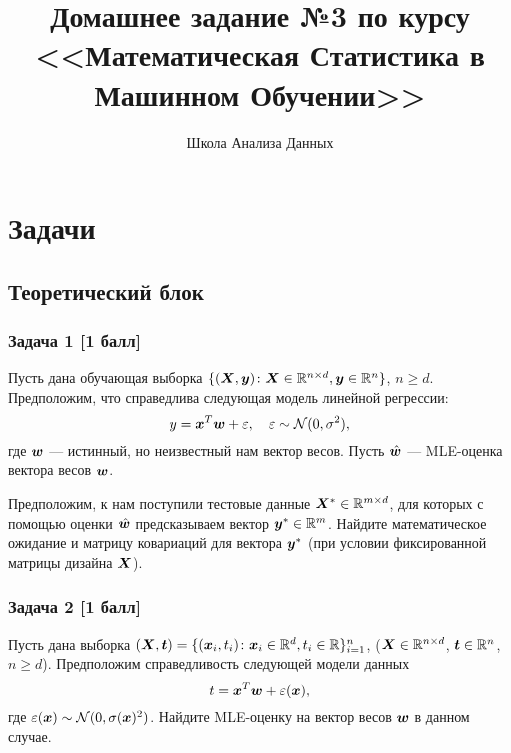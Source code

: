 \documentclass{article}
\title{Домашнее задание №3 по курсу \\ <<Математическая Статистика в Машинном Обучении>>}
\author{Школа Анализа Данных}
\date{}
\theoremstyle{plain}
\begin{document}

\maketitle

\section*{Задачи}
\subsection*{Теоретический блок}
\subsubsection*{Задача 1 [1 балл]}
Пусть дана обучающая выборка $\{(\boldsymbol{X}, \boldsymbol{y}) \colon \boldsymbol{X} \in \mathbb{R}^{n \times d}, \boldsymbol{y} \in \mathbb{R}^{n} \}$, $n \ge d$. Предположим, что справедлива следующая модель линейной регрессии:
$$
y = \boldsymbol{x}^T\boldsymbol{w} + \varepsilon, \quad \varepsilon \sim \mathcal{N}(0, \sigma^2),
$$
где $\boldsymbol{w}$ --- истинный, но неизвестный нам вектор весов. Пусть $\hat{\boldsymbol{w}}$ --- MLE-оценка вектора весов $\boldsymbol{w}$.

Предположим, к нам поступили тестовые данные $\boldsymbol{X}^* \in \mathbb{R}^{m \times d}$, для которых с помощью оценки $\hat{\boldsymbol{w}}$ предсказываем вектор $\boldsymbol{y}^*\in \mathbb{R}^{m}$.
Найдите математическое ожидание и матрицу ковариаций для вектора $\boldsymbol{y}^*$ (при условии фиксированной матрицы дизайна $\boldsymbol{X}$).

\subsubsection*{Задача 2 [1 балл]}
Пусть дана выборка $(\boldsymbol{X},\boldsymbol{t}) = \{(\boldsymbol{x}_i, t_i)\colon \boldsymbol{x}_i \in \mathbb{R}^d, t_i \in \mathbb{R}\}_{i = 1}^n$, ($\boldsymbol{X} \in \mathbb{R}^{n \times d}$, $\boldsymbol{t} \in \mathbb{R}^n$, $n \ge d$). Предположим справедливость следующей модели данных
$$
t = \boldsymbol{x}^T\boldsymbol{w} + \varepsilon(\boldsymbol{x}),
$$
где $\varepsilon(\boldsymbol{x}) \sim \mathcal{N}(0, \sigma(\boldsymbol{x})^2)$. Найдите MLE-оценку на вектор весов $\boldsymbol{w}$ в данном случае.
\end{document}
